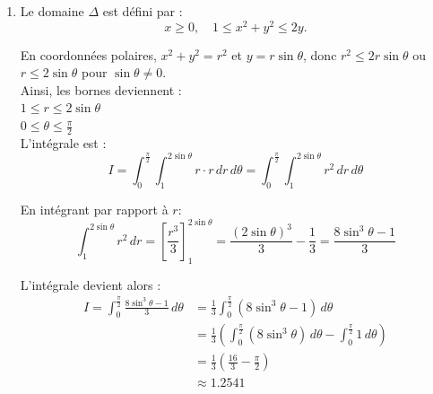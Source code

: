 \begin{solution}
\begin{enumerate}[label=(\alph*)]
        En intégrant par rapport à \( r \) :
        \[
        \int_1^2 \frac{1}{2} \sin(2\theta) \, r \, dr = \frac{1}{2} \sin(2\theta) \cdot \frac{r^2}{2} \Big|_1^2 = \frac{1}{2} \sin(2\theta) \cdot \frac{4 - 1}{2} = \frac{3}{4} \sin(2\theta)
        \]

        puis par rapport à \( \theta \) :
        \[
        I = \int_0^{\frac{\pi}{2}} \frac{3}{4} \sin(2\theta) \, d\theta = \frac{3}{4} \cdot \left[ -\frac{\cos(2\theta)}{2} \right]_0^{\frac{\pi}{2}} = \frac{3}{4} \cdot 1 = \frac{3}{4}
        \]

        \item Le domaine \( \Delta \) est défini par :
        \[
        x \geq 0, \quad 1 \leq x^2 + y^2 \leq 2y.
        \]
    
        En coordonnées polaires, \( x^2 + y^2 = r^2 \) et \( y = r \sin \theta \), donc \( r^2 \leq 2r \sin \theta \) ou \( r \leq 2 \sin \theta \) pour \( \sin \theta \neq 0 \). \\
    
        Ainsi, les bornes deviennent : \\
        \( 1 \leq r \leq 2 \sin \theta \) \\
        \( 0 \leq \theta \leq \frac{\pi}{2} \) \\

        L'intégrale est :
        \[
        I = \int_0^{\frac{\pi}{2}} \int_1^{2 \sin \theta} r \cdot r \, dr \, d\theta = \int_0^{\frac{\pi}{2}} \int_1^{2 \sin \theta} r^2 \, dr \, d\theta
        \]

        En intégrant par rapport à \( r \):
        \[
        \int_1^{2 \sin \theta} r^2 \, dr = \left[ \frac{r^3}{3} \right]_1^{2 \sin \theta} = \frac{(2 \sin \theta)^3}{3} - \frac{1}{3} = \frac{8 \sin^3 \theta - 1}{3}
        \]
        
        L'intégrale devient alors :
        \[
        \begin{aligned}
            I = \int_0^{\frac{\pi}{2}} \frac{8 \sin^3 \theta - 1}{3} \, d\theta &= \frac{1}{3} \int_0^{\frac{\pi}{2}} (8 \sin^3 \theta - 1) \, d\theta \\
            &= \frac{1}{3} ( \int_0^{\frac{\pi}{2}} (8 \sin^3 \theta) \, d\theta - \int_0^{\frac{\pi}{2}} 1 \, d\theta) \\
            &= \frac{1}{3} ( \frac{16}{3} - \frac{\pi}{2}) \\
            &\approx 1.2541
        \end{aligned}
        \]
        

    \end{enumerate}
\end{solution}
